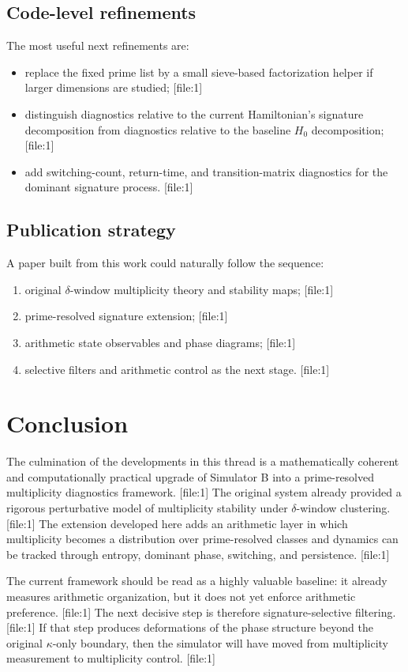 \documentclass[11pt]{article}
\begin{document}
\subsection{Code-level refinements}

The most useful next refinements are:
\begin{itemize}
    \item replace the fixed prime list by a small sieve-based factorization helper if larger dimensions are studied; [file:1]
    \item distinguish diagnostics relative to the current Hamiltonian's signature decomposition from diagnostics relative to the baseline $H_0$ decomposition; [file:1]
    \item add switching-count, return-time, and transition-matrix diagnostics for the dominant signature process. [file:1]
\end{itemize}

\subsection{Publication strategy}

A paper built from this work could naturally follow the sequence:
\begin{enumerate}
    \item original $\delta$-window multiplicity theory and stability maps; [file:1]
    \item prime-resolved signature extension; [file:1]
    \item arithmetic state observables and phase diagrams; [file:1]
    \item selective filters and arithmetic control as the next stage. [file:1]
\end{enumerate}

\section{Conclusion}

The culmination of the developments in this thread is a mathematically coherent and computationally practical upgrade of Simulator B into a prime-resolved multiplicity diagnostics framework. [file:1] The original system already provided a rigorous perturbative model of multiplicity stability under $\delta$-window clustering. [file:1] The extension developed here adds an arithmetic layer in which multiplicity becomes a distribution over prime-resolved classes and dynamics can be tracked through entropy, dominant phase, switching, and persistence. [file:1]

The current framework should be read as a highly valuable baseline: it already measures arithmetic organization, but it does not yet enforce arithmetic preference. [file:1] The next decisive step is therefore signature-selective filtering. [file:1] If that step produces deformations of the phase structure beyond the original $\kappa$-only boundary, then the simulator will have moved from multiplicity measurement to multiplicity control. [file:1]
\nocite{*}


\end{document}
